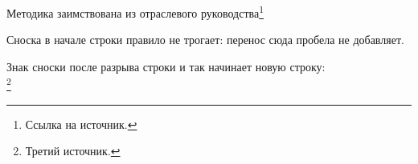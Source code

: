 Методика заимствована из отраслевого руководства\footnote{Ссылка на источник.}

Сноска в начале строки правило не трогает: перенос сюда пробела не добавляет.

Знак сноски после разрыва строки и так начинает новую строку:\\ \footnote{Третий источник.}
